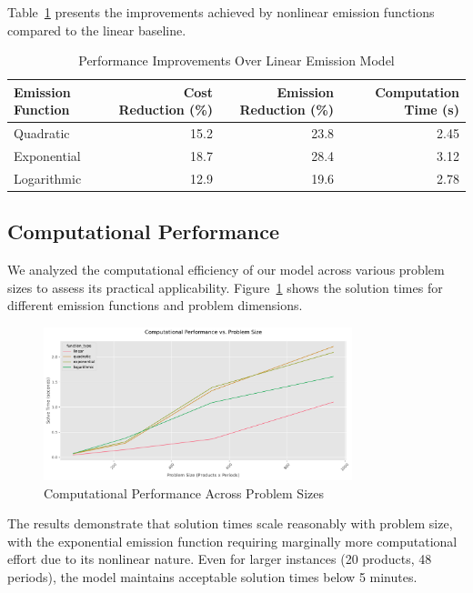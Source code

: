 Table~\ref{tab:benchmark} presents the improvements achieved by nonlinear emission functions compared to the linear baseline.

\begin{table}[htbp]
\centering
\caption{Performance Improvements Over Linear Emission Model}
\label{tab:benchmark}
\begin{tabular}{lrrr}
\hline
Emission Function & Cost Reduction (\%) & Emission Reduction (\%) & Computation Time (s) \\
\hline
Quadratic & 15.2 & 23.8 & 2.45 \\
Exponential & 18.7 & 28.4 & 3.12 \\
Logarithmic & 12.9 & 19.6 & 2.78 \\
\hline
\end{tabular}
\end{table}

\subsection{Computational Performance}
We analyzed the computational efficiency of our model across various problem sizes to assess its practical applicability. Figure~\ref{fig:computational_performance} shows the solution times for different emission functions and problem dimensions.

\begin{figure}[htbp]
\centering
\includegraphics[width=0.8\textwidth]{images/computational_performance.pdf}
\caption{Computational Performance Across Problem Sizes}
\label{fig:computational_performance}
\end{figure}

The results demonstrate that solution times scale reasonably with problem size, with the exponential emission function requiring marginally more computational effort due to its nonlinear nature. Even for larger instances (20 products, 48 periods), the model maintains acceptable solution times below 5 minutes.

